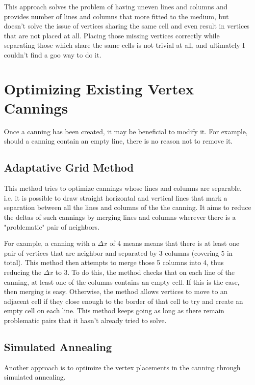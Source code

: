 \documentclass{report}
\begin{document}
This approach solves the problem of having uneven lines and columns and provides number of lines and columns that more fitted to the medium, but doesn't solve the issue of vertices sharing the same cell and even result in vertices that are not placed at all. Placing those missing vertices correctly while separating those which share the same cells is not trivial at all, and ultimately I couldn't find a goo way to do it. 

\section{Optimizing Existing Vertex Cannings}

Once a canning has been created, it may be beneficial to modify it. For example, should a canning contain an empty line, there is no reason not to remove it.

\subsection{Adaptative Grid Method}

This method tries to optimize cannings whose lines and columns are separable, i.e. it is possible to draw straight horizontal and vertical lines that mark a separation between all the lines and columns of the the canning. It aims to reduce the deltas of such cannings by merging lines and columns wherever there is a "problematic" pair of neighbors. 

For example, a canning with a $\Delta x$ of 4 means means that there  is at least one pair of vertices that are neighbor and separated by 3 columns (covering 5 in total). This method then attempts to merge those 5 columns into 4, thus reducing the $\Delta x$ to 3. To do this, the method checks that on each line of the canning, at least one of the columns contains an empty cell. If this is the case, then merging is easy. Otherwise, the method allows vertices to move to an adjacent cell if they close enough to the border of that cell to try and create an empty cell on each line. This method keeps going as long as there remain problematic pairs that it hasn't already tried to solve.

\subsection{Simulated Annealing}

Another approach is to optimize the vertex placements in the canning through simulated annealing.
\end{document}

